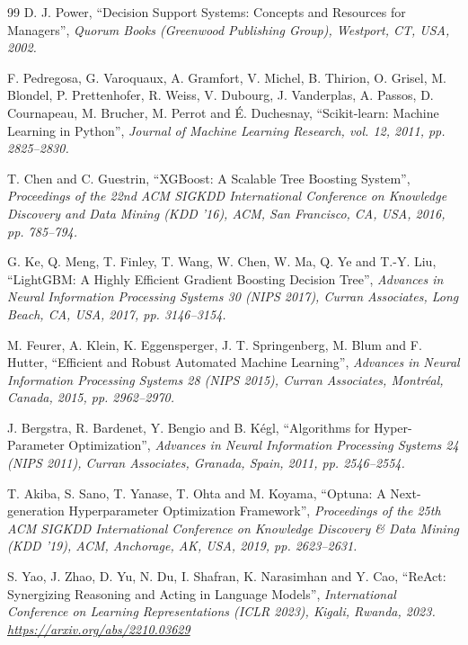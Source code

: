 \begin{thebibliography}{99}
 D. J. Power, ``Decision Support Systems: Concepts and Resources for Managers'', \textit{Quorum Books (Greenwood Publishing Group), Westport, CT, USA, 2002.}

 F. Pedregosa, G. Varoquaux, A. Gramfort, V. Michel, B. Thirion, O. Grisel, M. Blondel, P. Prettenhofer, R. Weiss, V. Dubourg, J. Vanderplas, A. Passos, D. Cournapeau, M. Brucher, M. Perrot and \'{E}. Duchesnay, ``Scikit-learn: Machine Learning in Python'', \textit{Journal of Machine Learning Research, vol. 12, 2011, pp. 2825--2830.}

 T. Chen and C. Guestrin, ``XGBoost: A Scalable Tree Boosting System'', \textit{Proceedings of the 22nd ACM SIGKDD International Conference on Knowledge Discovery and Data Mining (KDD '16), ACM, San Francisco, CA, USA, 2016, pp. 785--794.}

 G. Ke, Q. Meng, T. Finley, T. Wang, W. Chen, W. Ma, Q. Ye and T.-Y. Liu, ``LightGBM: A Highly Efficient Gradient Boosting Decision Tree'', \textit{Advances in Neural Information Processing Systems 30 (NIPS 2017), Curran Associates, Long Beach, CA, USA, 2017, pp. 3146--3154.}

 M. Feurer, A. Klein, K. Eggensperger, J. T. Springenberg, M. Blum and F. Hutter, ``Efficient and Robust Automated Machine Learning'', \textit{Advances in Neural Information Processing Systems 28 (NIPS 2015), Curran Associates, Montr\'{e}al, Canada, 2015, pp. 2962--2970.}

 J. Bergstra, R. Bardenet, Y. Bengio and B. K\'{e}gl, ``Algorithms for Hyper-Parameter Optimization'', \textit{Advances in Neural Information Processing Systems 24 (NIPS 2011), Curran Associates, Granada, Spain, 2011, pp. 2546--2554.}

 T. Akiba, S. Sano, T. Yanase, T. Ohta and M. Koyama, ``Optuna: A Next-generation Hyperparameter Optimization Framework'', \textit{Proceedings of the 25th ACM SIGKDD International Conference on Knowledge Discovery \& Data Mining (KDD '19), ACM, Anchorage, AK, USA, 2019, pp. 2623--2631.}

 S. Yao, J. Zhao, D. Yu, N. Du, I. Shafran, K. Narasimhan and Y. Cao, ``ReAct: Synergizing Reasoning and Acting in Language Models'', \textit{International Conference on Learning Representations (ICLR 2023), Kigali, Rwanda, 2023. \url{https://arxiv.org/abs/2210.03629}}


\end{thebibliography}
